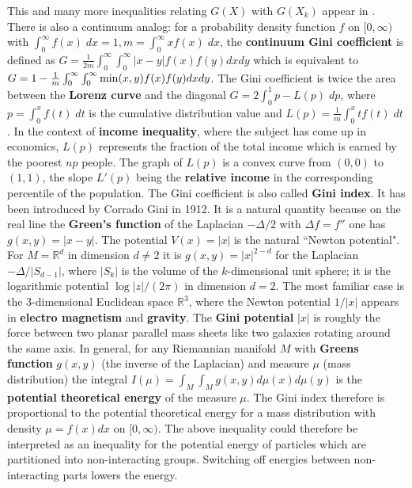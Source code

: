 \documentclass[12pt]{amsart}
\def\satz#1{ \vspace{2mm} \begin{center} \fcolorbox{yellow1}{yellow1}{ \parbox{14.0cm}{{\bf Theorem:} #1}} \vspace{2mm} \end{center} }
\begin{document}
\satz{ $n G(X) \geq \sum_{k=1}^r n_k G(X_k)$ }

This and many more inequalities relating $G(X)$ with $G(X_k)$ appear in
\cite{Zagier1983}. There is also a continuum analog:
for a probability density function $f$ on $[0,\infty)$ with
$\int_0^{\infty} f(x) \; dx=1, m=\int_0^{\infty} x f(x) \; dx$, the
{\bf continuum Gini coefficient} is defined as
$G=\frac{1}{2m} \int_0^{\infty} \int_0^{\infty} |x-y| f(x) f(y) dx dy$
which is equivalent to
$G=1-\frac{1}{m} \int_0^{\infty} \int_0^{\infty} {\rm min}(x,y) f(x) f(y) dx dy$.
The Gini coefficient is twice the area between the {\bf Lorenz curve}
and the diagonal $G=2 \int_0^1 p - L(p) \; dp$, where $p = \int_0^x f(t) \; dt$ is the cumulative
distribution value and $L(p) = \frac{1}{m} \int_0^x t f(t) \; dt$.
In the context of {\bf income inequality}, where the subject has come up in
economics, $L(p)$ represents the fraction of the total income which is
earned by the poorest $n p$ people.
The graph of $L(p)$ is a convex curve from $(0,0)$ to $(1,1)$, the slope
$L'(p)$ being the {\bf relative income} in the corresponding percentile
of the population. The Gini coefficient is also called {\bf Gini index}.
It has been introduced by Corrado Gini in 1912. It is a natural
quantity because on the real line the {\bf Green's function} of the Laplacian
$-\Delta/2$ with $\Delta f=f''$ one has
$g(x,y) = |x-y|$. The potential $V(x)=|x|$ is the
natural ``Newton potential". For $M=\mathbb{R}^d$ in dimension $d \neq 2$ it is
$g(x,y) = |x|^{2-d}$ for the Laplacian $-\Delta/|S_{d-1}|$, where $|S_k|$ is
the volume of the $k$-dimensional unit sphere;
it is the logarithmic potential $\log|z|/(2\pi)$ in dimension $d=2$.
The most familiar case is the 3-dimensional Euclidean space $\mathbb{R}^3$, where the Newton
potential $1/|x|$ appears in {\bf electro magnetism} and {\bf gravity}. 
The {\bf Gini potential} $|x|$ is roughly the force between two planar parallel mass sheets
like two galaxies rotating around the same axis. 
In general, for any Riemannian manifold $M$ with {\bf Greens function} $g(x,y)$
(the inverse of the Laplacian) and measure $\mu$ (mass distribution)
the integral $I(\mu) = \int_{M} \int_{M} g(x,y) d\mu(x) d\mu(y)$ is the
{\bf potential theoretical energy} of the measure $\mu$. The Gini index therefore is
proportional to the potential theoretical energy for a mass
distribution with density $\mu = f(x) dx$ on $[0,\infty)$. The above inequality
could therefore be interpreted as an inequality for the potential energy of particles
which are partitioned into non-interacting groups. Switching off energies between
non-interacting parts lowers the energy. 
\end{document}
